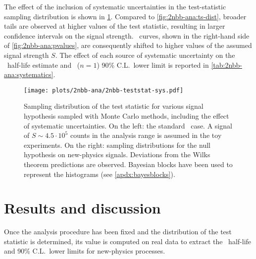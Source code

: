 The effect of the inclusion of systematic uncertainties in the test-statistic sampling
distribution is shown in \cref{fig:2nbb-ana:ts-dist-sys}. Compared to
\cref{fig:2nbb-ana:ts-dist}, broader tails are observed at higher values of the test
statistic, resulting in larger confidence intervals on the signal strength. \pvalue\
curves, shown in the right-hand side of \cref{fig:2nbb-ana:pvalues}, are consequently
shifted to higher values of the assumed signal strength $S$. The effect of each source of
systematic uncertainty on the \nnbb\ half-life estimate and \onbbx\ ($n=1$) 90\%
C.L.~lower limit is reported in \cref{tab:2nbb-ana:systematics}.

\begin{figure}
  \centering
  \texttt{[image: plots/2nbb-ana/2nbb-teststat-sys.pdf]}
  \caption{%
    Sampling distribution of the test statistic for various signal hypothesis sampled with
    Monte Carlo methods, including the effect of systematic uncertainties. On the left:
    the standard \nnbb\ case. A signal of $S \sim 4.5 \cdot 10^5$ counts in the analysis
    range is assumed in the toy experiments. On the right: sampling distributions for the
    null hypothesis on new-physics signals.  Deviations from the Wilks theorem predictions
    are observed. Bayesian blocks have been used to represent the histograms (see
    \cref{apdx:bayesblocks}). \fillme{add LV}
  }\label{fig:2nbb-ana:ts-dist-sys}
\end{figure}

\begin{table}
  \centering
  \caption{%
    Summary of the systematic uncertainties affecting the \nnbb\ distribution analysis.
    For brevity, only results for the ordinary \nnbb\ half-life estimate and the \onbbx\
    ($n=1$) 90\% C.L.~lower limit are reported.
    \fillme{numbers}
  }\label{tab:2nbb-ana:systematics}
  
\end{table}

\section{Results and discussion}%
\label{sec:2nbb-ana:results}

Once the analysis procedure has been fixed and the distribution of the test statistic is
determined, its value is computed on real data to extract the \nnbb\ half-life and 90\%
C.L.~lower limits for new-physics processes.

